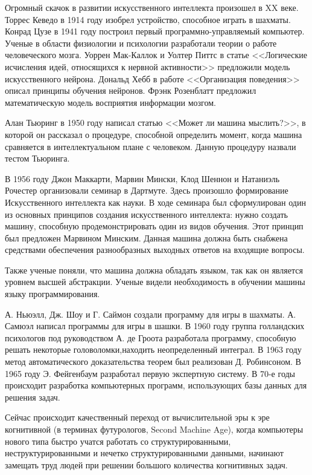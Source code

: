 \documentclass[bachelor,och,referat]{SCWorks_corrected}
\begin{document}
Огромный скачок в развитии искусственного интеллекта произошел в XX веке. Торрес Кеведо в 1914 году изобрел устройство, способное играть в шахматы. Конрад Цузе в 1941 году построил первый программно-управляемый компьютер. Ученые в области физиологии и психологии разработали теории о работе человеческого мозга. Уоррен Мак-Каллок и Уолтер Питтс в статье <<Логические исчисления идей, относящихся к нервной активности>> предложили модель искусственного нейрона. Дональд Хебб в работе <<Организация поведения>> описал принципы обучения нейронов. Фрэнк Розенблатт предложил математическую модель восприятия информации мозгом.

Алан Тьюринг в 1950 году написал статью <<Может ли машина мыслить?>>, в которой он рассказал о процедуре, способной определить момент, когда машина сравняется в интеллектуальном плане с человеком. Данную процедуру назвали тестом Тьюринга.

В 1956 году Джон Маккарти, Марвин Мински, Клод Шеннон и Натаниэль Рочестер организовали семинар в Дартмуте. Здесь произошло формирование Искусственного интеллекта как науки. В ходе семинара был сформулирован один из основных принципов создания искусственного интеллекта: нужно создать машину, способную продемонстрировать один из видов обучения. Этот принцип был предложен Марвином Минским. Данная машина должна быть снабжена средствами обеспечения разнообразных выходных ответов на входящие вопросы. 

Также ученые поняли, что машина должна обладать языком, так как он является уровнем высшей абстракции. Ученые видели необходимость в обучении машины языку программирования.

А. Ньюэлл, Дж. Шоу и Г. Саймон создали программу для игры в шахматы. А. Самюэл написал программы для игры в шашки. В 1960 году группа голландских психологов под руководством А. де Гроота разработала программу, способную решать некоторые головоломки,находить неопределенный интеграл. В 1963 году метод автоматического доказательства теорем был реализован Д. Робинсоном. В 1965 году Э. Фейгенбаум разработал первую экспертную систему. В 70-е годы происходит разработка компьютерных программ, использующих базы данных для решения задач.

Сейчас происходит качественный переход от вычислительной эры к эре когнитивной (в терминах футурологов, Second Machine Age), когда компьютеры нового типа быстро учатся работать со структурированными, неструктурированными и нечетко структурированными данными, начинают замещать труд людей при решении большого количества когнитивных задач.\cite{N9}
\end{document}
